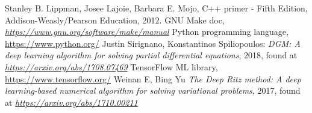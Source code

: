 \documentclass[12pt, a4paper]{report}
\theoremstyle{definition}
\begin{document}
\begin{thebibliography}{10}
	 Stanley B. Lippman, Josee Lajoie, Barbara E. Mojo, C++ primer - Fifth Edition, Addison-Weasly/Pearson Education, 2012.
	 GNU Make doc,  \href{https://www.gnu.org/software/make/manual}{\emph{https://www.gnu.org/software/make/manual}}
	 Python programming language, \href{https://www.python.org/}{https://www.python.org/}
	Justin Sirignano, Konstantinos Spiliopoulos: \emph{DGM: A deep learning algorithm for solving partial differential equations}, 2018, found at \href{https://arxiv.org/abs/1708.07469}{\emph{https://arxiv.org/abs/1708.07469}}
	 TensorFlow ML library, \href{https://www.tensorflow.org/}{https://www.tensorflow.org/}
	 Weinan E, Bing Yu \emph{The Deep Ritz method: A deep learning-based numerical algorithm for solving variational problems}, 2017, found at \href{https://arxiv.org/abs/1710.00211}{\emph{https://arxiv.org/abs/1710.00211}}
	
\end{thebibliography}
\end{document}
